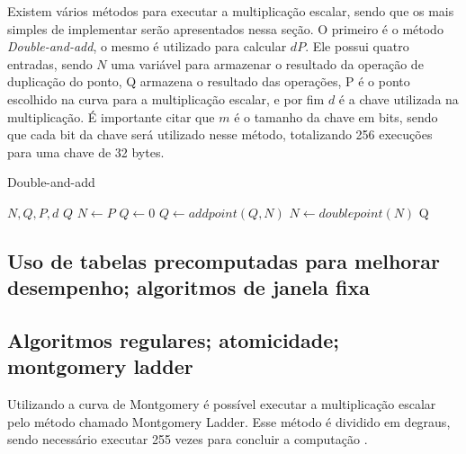 
Existem vários métodos para executar a multiplicação escalar, sendo que os mais simples de implementar serão apresentados nessa seção. O primeiro é o método \textit{Double-and-add}, o mesmo é utilizado para calcular $dP$. Ele possui quatro entradas, sendo $N$ uma variável para armazenar o resultado da operação de duplicação do ponto, Q armazena o resultado das operações, P é o ponto escolhido na curva para a multiplicação escalar, e por fim $d$ é a chave utilizada na multiplicação. É importante citar que $m$ é o tamanho da chave em bits, sendo que cada bit da chave será utilizado nesse método, totalizando 256 execuções para uma chave de 32 bytes.

\begin{algorithm}[H]
\caption{Double-and-add}
\begin{algorithmic} 
    \REQUIRE $N, Q, P, d$
    \ENSURE $Q$
    \STATE $N \leftarrow P$
    \STATE $Q \leftarrow 0$
            \STATE $Q \leftarrow addpoint(Q, N)$
        \ENDIF
        \STATE $N \leftarrow doublepoint(N)$
    \ENDFOR
    \RETURN Q
    \end{algorithmic}
\end{algorithm}


\subsection{Uso de tabelas precomputadas para melhorar desempenho; algoritmos de janela fixa}

\subsection{Algoritmos regulares; atomicidade; montgomery ladder}

Utilizando a curva de Montgomery é possível executar a multiplicação escalar pelo método chamado Montgomery Ladder. Esse método é dividido em degraus, sendo necessário executar 255 vezes para concluir a computação \cite{Dull:2015:HCM:2834659.2834708}.

